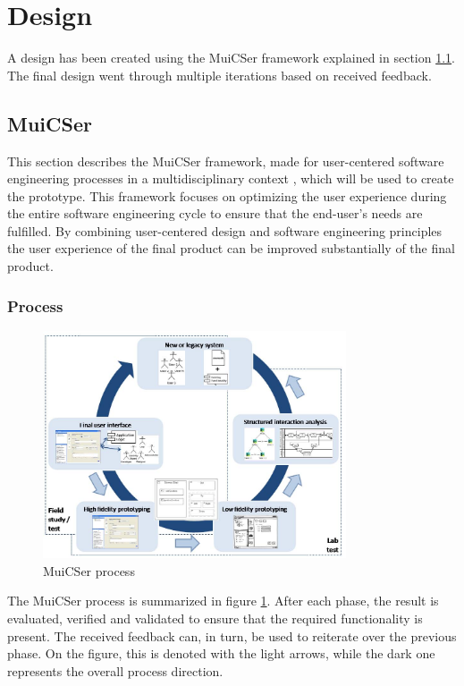 \section{Design} \label{design}

A design has been created using the MuiCSer framework explained in section \ref{2_muicser}. The final design went through multiple iterations based on received feedback.

    \subsection{MuiCSer} \label{2_muicser}
    This section describes the MuiCSer framework, made for user-centered software engineering processes in a multidisciplinary context \cite{muicser}, which will be used to create the prototype. This framework focuses on optimizing the user experience during the entire software engineering cycle to ensure that the end-user's needs are fulfilled. By combining user-centered design and software engineering principles the user experience of the final product can be improved substantially of the final product.

        \subsubsection{Process}
        
        \begin{figure}[!t]
            \centering
            \includegraphics[width=0.8\textwidth]{chapters/3_design/muicser}
            \caption{MuiCSer process}\label{fig:muicser}
        \end{figure}

        The MuiCSer process is summarized in figure \ref{fig:muicser}. After each phase, the result is evaluated, verified and validated to ensure that the required functionality is present. The received feedback can, in turn, be used to reiterate over the previous phase. On the figure, this is denoted with the light arrows, while the dark one represents the overall process direction.

